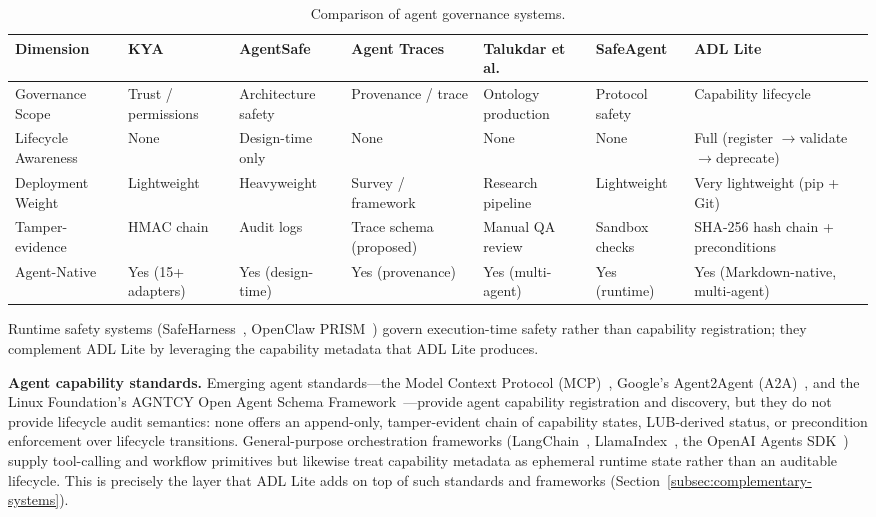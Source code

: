 \begin{table}[htbp]
\centering
\footnotesize
\caption{Comparison of agent governance systems.}
\label{tab:agent-governance}
\begin{tabularx}{\textwidth}{@{}p{2.2cm}XXXXXX@{}}
\toprule
\textbf{Dimension} & \textbf{KYA} & \textbf{AgentSafe} & \textbf{Agent Traces} & \textbf{Talukdar et al.} & \textbf{SafeAgent} & \textbf{ADL Lite} \\
\midrule
Governance Scope & Trust / permissions & Architecture safety & Provenance / trace & Ontology production & Protocol safety & Capability lifecycle \\
Lifecycle Awareness & None & Design-time only & None & None & None & Full (register $\to$\allowbreak validate $\to$\allowbreak deprecate) \\
Deployment Weight & Lightweight & Heavyweight & Survey / framework & Research pipeline & Lightweight & Very lightweight (pip + Git) \\
Tamper-evidence & HMAC chain & Audit logs & Trace schema (proposed) & Manual QA review & Sandbox checks & SHA-256 hash chain + preconditions \\
Agent-Native & Yes (15+ adapters) & Yes (design-time) & Yes (provenance) & Yes (multi-agent) & Yes (runtime) & Yes (Markdown-native, multi-agent) \\
\bottomrule
\end{tabularx}
\end{table}

Runtime safety systems (SafeHarness~\cite{safeharness2026}, OpenClaw PRISM~\cite{openclaw_prism2026}) govern execution-time safety rather than capability registration; they complement ADL Lite by leveraging the capability metadata that ADL Lite produces.

\textbf{Agent capability standards.} Emerging agent standards---the Model Context Protocol (MCP)~\cite{mcp2024anthropic}, Google's Agent2Agent (A2A)~\cite{a2a2025google}, and the Linux Foundation's AGNTCY Open Agent Schema Framework~\cite{agntcy2025linux}---provide agent capability registration and discovery, but they do not provide lifecycle audit semantics: none offers an append-only, tamper-evident chain of capability states, LUB-derived status, or precondition enforcement over lifecycle transitions. General-purpose orchestration frameworks (LangChain~\cite{langchain}, LlamaIndex~\cite{llamaindex}, the OpenAI Agents SDK~\cite{openai_agents}) supply tool-calling and workflow primitives but likewise treat capability metadata as ephemeral runtime state rather than an auditable lifecycle. This is precisely the layer that ADL Lite adds on top of such standards and frameworks (Section~\ref{subsec:complementary-systems}).

